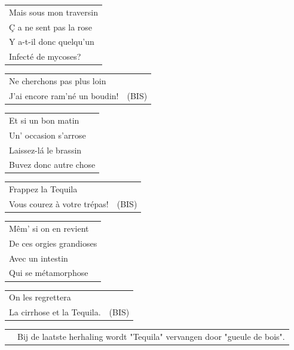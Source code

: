 \documentclass[a4paper, 14pt]{extarticle}
\begin{document}
\begin{flushleft}
\begin{tabularx}{0.8\textwidth} {
   >{\raggedright\arraybackslash}X}
Mais sous mon traversin \\
Ç a ne sent pas la rose \\
Y a-t-il donc quelqu’un \\
Infecté de mycoses? \\
\end{tabularx}
\begin{tabularx}{0.8\textwidth} {
   >{\raggedright\arraybackslash}X | c}
Ne cherchons pas plus loin & \\
J’ai encore ram’né un boudin! & (BIS)\\
\end{tabularx}
\end{flushleft}
\begin{flushleft}
\begin{tabularx}{0.8\textwidth} {
   >{\raggedright\arraybackslash}X}
Et si un bon matin \\
Un’ occasion s’arrose \\
Laissez-lá le brassin \\
Buvez donc autre chose \\
\end{tabularx}
\begin{tabularx}{0.8\textwidth} {
   >{\raggedright\arraybackslash}X | c}
Frappez la Tequila & \\
Vous courez à votre trépas!  & (BIS)\\
\end{tabularx}
\end{flushleft}
\begin{flushleft}
\begin{tabularx}{0.8\textwidth} {
   >{\raggedright\arraybackslash}X}
Mêm’ si on en revient\\
De ces orgies grandioses \\
Avec un intestin \\
Qui se métamorphose\\
\end{tabularx}
\begin{tabularx}{0.8\textwidth} {
   >{\raggedright\arraybackslash}X | c}
On les regrettera & \\
La cirrhose et la Tequila.  & (BIS)\\
\end{tabularx}
\end{flushleft}
\begin{flushleft}
\begin{tabularx}{0.8\textwidth} {
   c >{\raggedright\arraybackslash}X}
\hspace{5mm} & {\small }Bij de laatste herhaling wordt "Tequila" vervangen door "gueule de bois".
\end{tabularx}
\end{flushleft}
\end{document}
